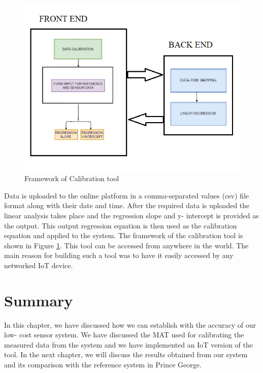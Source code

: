 \begin{figure}[h]
  \begin{center}
  \includegraphics[scale=1.09]{./images/figure32.png} 
  \end{center}
  \caption{Framework of Calibration tool}
  \label{frame}
\end{figure}

Data is uploaded to the online platform in a comma-separated values (csv) file format along with their date and time. After the required data is uploaded the linear analysis takes place and the regression slope and y- intercept is provided as the output. This output regression equation is then used as the calibration equation and applied to the system. The framework of the calibration tool is shown in Figure \ref{frame}. This tool can be accessed from anywhere in the world. The main reason for building such a tool was to have it easily accessed by any networked IoT device.



\section{Summary}

In this chapter, we have discussed how we can establish with the accuracy of our low- cost sensor system. We have discussed the MAT used for calibrating the measured data from the system and we have implemented an IoT version of the tool. In the next chapter, we will discuss the results obtained from our system and its comparison with the reference system in Prince George.



